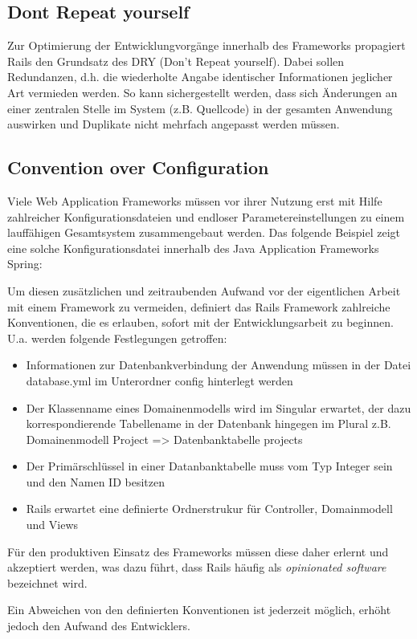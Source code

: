 \subsection{Dont Repeat yourself}
Zur Optimierung der Entwicklungvorgänge innerhalb des Frameworks propagiert Rails den Grundsatz des DRY (Don't Repeat yourself). Dabei sollen Redundanzen, d.h. die wiederholte Angabe identischer Informationen jeglicher Art vermieden werden. So kann sichergestellt werden, dass sich Änderungen an einer zentralen Stelle im System (z.B. Quellcode) in der gesamten Anwendung auswirken und Duplikate nicht mehrfach angepasst werden müssen.
\subsection{Convention over Configuration}
Viele Web Application Frameworks müssen vor ihrer Nutzung erst mit Hilfe zahlreicher Konfigurationsdateien und endloser Parametereinstellungen zu einem lauffähigen Gesamtsystem zusammengebaut werden. Das folgende Beispiel zeigt eine solche Konfigurationsdatei innerhalb des Java Application Frameworks Spring:



Um diesen zusätzlichen und zeitraubenden Aufwand vor der eigentlichen Arbeit mit einem Framework zu vermeiden, definiert das Rails Framework zahlreiche Konventionen, die es erlauben, sofort mit der Entwicklungsarbeit zu beginnen. U.a. werden folgende Festlegungen getroffen:

\begin{itemize}
\item
Informationen zur Datenbankverbindung der Anwendung müssen in der Datei database.yml im Unterordner config hinterlegt werden
\item
Der Klassenname eines Domainenmodells wird im Singular erwartet, der dazu korrespondierende Tabellename in der Datenbank hingegen im Plural z.B. Domainenmodell Project => Datenbanktabelle projects
\item
Der Primärschlüssel in einer Datanbanktabelle muss vom Typ Integer sein und den Namen ID besitzen
\item
Rails erwartet eine definierte Ordnerstrukur für Controller, Domainmodell und Views
\end{itemize}
Für den produktiven Einsatz des Frameworks müssen diese daher erlernt und akzeptiert werden, was dazu führt, dass Rails häufig als \emph{opinionated software} bezeichnet wird.

Ein Abweichen von den definierten Konventionen ist jederzeit möglich, erhöht jedoch den Aufwand des Entwicklers.

